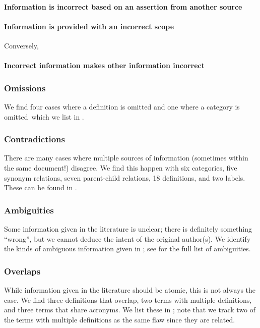 \paragraph{Information is incorrect based on an assertion from another source}
\errorGuessFlaw{}

\paragraph{Information is provided with an incorrect scope}
\parSheetTestFlaw{} Conversely, \tolTestFlaw*{}

\paragraph{Incorrect information makes other information incorrect}
\redBoxFlaw{}

\subsubsection{Omissions}\label{miss}
We find four cases where a definition is omitted and one where a category is
omitted\ifnotpaper\ which we list in \fi.

\subsubsection{Contradictions}\label{contra}
There are many cases where multiple sources of information (sometimes within
the same document!) disagree. We find this happen with six categories, five
synonym relations, seven parent-child relations, 18 definitions, and two
labels. \ifnotpaper These can be found in .\fi

\subsubsection{Ambiguities}\label{ambi}
Some information given in the literature is unclear; there is definitely
something ``wrong'', but we cannot deduce the intent of the original author(s).
We identify the kinds of ambiguous information given in %
\ifnotpaper; see  for the full list of ambiguities\fi.



\subsubsection{Overlaps}\label{over}
While information given in the literature should be atomic, this is not
always the case. We find three definitions that overlap, two terms with
multiple definitions, and three terms that share acronyms. \ifnotpaper We list
    these in ; note that we track two of the terms with
    multiple definitions as the same flaw since they are related. \fi


